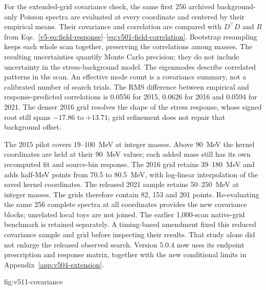 For the extended-grid covariance check, the same first 256 archived
background-only Poisson spectra are evaluated at every coordinate and
centered by their empirical means. Their covariance
and correlation are compared with $D^\top D$ and $R$ from
Eqs.~\ref{v5-eq:field-response}--\ref{eq:v501-field-correlation}.
Bootstrap resampling keeps each whole scan together, preserving the
correlations among masses. The resulting uncertainties quantify Monte Carlo
precision; they do not include uncertainty in the stress-background model.
The eigenmodes describe correlated patterns in the scan. An effective
mode count is a covariance summary, not a calibrated number of search trials.
The RMS difference between empirical and response-predicted correlations
is 0.0556 for 2015, 0.0626 for 2016 and 0.0594 for 2021. The denser
2016 grid resolves the shape of the stress response, whose signed root
still spans $-17.86$ to $+13.71$; grid refinement does not repair that
background offset.

The 2015 pilot covers 19--100~MeV at integer masses. Above 90~MeV the
kernel coordinates are held at their 90~MeV values; each added mass still
has its own recomputed fit and source-bin response. The 2016 grid retains
39--180~MeV and adds half-MeV points from 70.5 to 80.5~MeV, with log-linear
interpolation of the saved kernel coordinates. The released 2021 sample
retains 50--250~MeV at integer masses. The grids therefore contain
82, 153 and 201 points. Re-evaluating the same 256 complete spectra at
all coordinates provides the new covariance blocks; unrelated local toys
are not joined. The earlier 1,000-scan native-grid benchmark is retained
separately. A timing-based amendment fixed this reduced covariance sample
and grid before inspecting their results. That study alone did not enlarge the released observed search. Version 5.0.4
now uses its endpoint prescription and response matrix, together with the
new conditional limits in Appendix~\ref{app:v504-extension}.

{fig:v511-covariance}
\FloatBarrier

